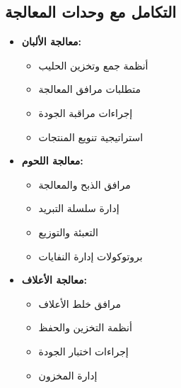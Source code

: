 \subsection{التكامل مع وحدات المعالجة}
\begin{itemize}
    \item \textbf{معالجة الألبان:}
    \begin{itemize}
        \item أنظمة جمع وتخزين الحليب
        \item متطلبات مرافق المعالجة
        \item إجراءات مراقبة الجودة
        \item استراتيجية تنويع المنتجات
    \end{itemize}
    
    \item \textbf{معالجة اللحوم:}
    \begin{itemize}
        \item مرافق الذبح والمعالجة
        \item إدارة سلسلة التبريد
        \item التعبئة والتوزيع
        \item بروتوكولات إدارة النفايات
    \end{itemize}
    
    \item \textbf{معالجة الأعلاف:}
    \begin{itemize}
        \item مرافق خلط الأعلاف
        \item أنظمة التخزين والحفظ
        \item إجراءات اختبار الجودة
        \item إدارة المخزون
    \end{itemize}
\end{itemize}

